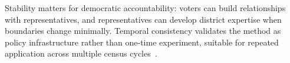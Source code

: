 Stability matters for democratic accountability: voters can build relationships with representatives, and representatives can develop district expertise when boundaries change minimally. Temporal consistency validates the method as policy infrastructure rather than one-time experiment, suitable for repeated application across multiple census cycles~\cite{deluca2026temporal}.
